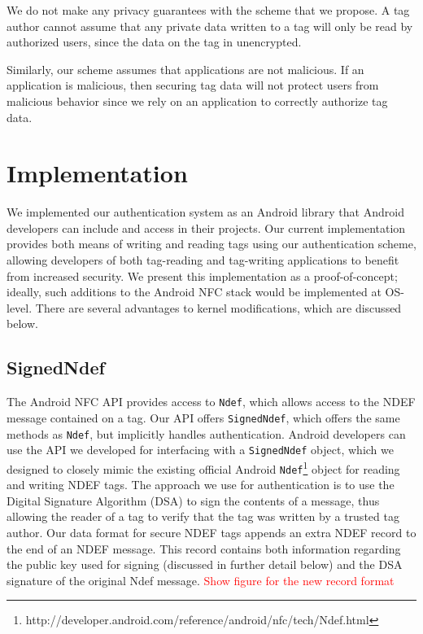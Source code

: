 \documentclass[12pt]{article}
\newcommand\TODO[1]{\textcolor{red}{#1}}
\begin{document}
We do not make any privacy guarantees with the scheme that we propose.
A tag author cannot assume that any private data written to a tag will only be read by authorized users, since the data on the tag in unencrypted.

Similarly, our scheme assumes that applications are not malicious.
If an application is malicious, then securing tag data will not protect users from malicious behavior since we rely on an application to correctly authorize tag data.

\section{Implementation}
We implemented our authentication system as an Android library that Android developers can include and access in their projects.
Our current implementation provides both means of writing and reading tags using our authentication scheme, allowing developers of both tag-reading and tag-writing applications to benefit from increased security.
We present this implementation as a proof-of-concept; ideally, such additions to the Android NFC stack would be implemented at OS-level.
There are several advantages to kernel modifications, which are discussed below.

\subsection{SignedNdef}
The Android NFC API provides access to \texttt{Ndef}, which allows access to the NDEF message contained on a tag.
Our API offers \texttt{SignedNdef}, which offers the same methods as \texttt{Ndef}, but implicitly handles authentication.
Android developers can use the API we developed for interfacing with a \texttt{SignedNdef} object, which we designed to closely mimic the existing official Android \texttt{Ndef}\footnote{http://developer.android.com/reference/android/nfc/tech/Ndef.html} object for reading and writing NDEF tags.
The approach we use for authentication is to use the Digital Signature Algorithm (DSA) to sign the contents of a message, thus allowing the reader of a tag to verify that the tag was written by a trusted tag author.
Our data format for secure NDEF tags appends an extra NDEF record to the end of an NDEF message.
This record contains both information regarding the public key used for signing (discussed in further detail below) and the DSA signature of the original Ndef message.
\TODO{Show figure for the new record format}
\end{document}
